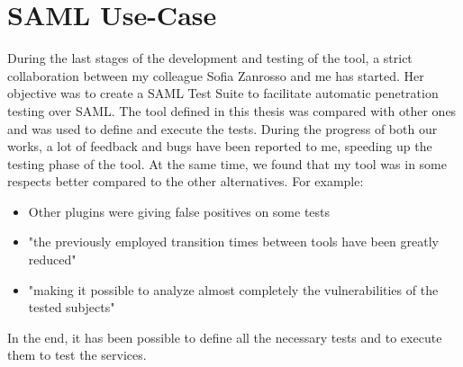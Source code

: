 \section{SAML Use-Case}
During the last stages of the development and testing of the tool, a strict collaboration between my colleague Sofia Zanrosso and me has started. Her objective was to create a \gls{SAML} Test Suite to facilitate automatic penetration testing over \gls{SAML}\cite{sofia_zanrosso}. The tool defined in this thesis was compared with other ones and was used to define and execute the tests. During the progress of both our works, a lot of feedback and bugs have been reported to me, speeding up the testing phase of the tool. At the same time, we found that my tool was in some respects better compared to the other alternatives. For example:
\begin{itemize}
    \item Other plugins were giving false positives on some tests
    \item "the previously employed transition times between tools have been greatly reduced"
    \item "making it possible to analyze almost completely the vulnerabilities of the tested subjects"
\end{itemize}
In the end, it has been possible to define all the necessary tests and to execute them to test the services.






